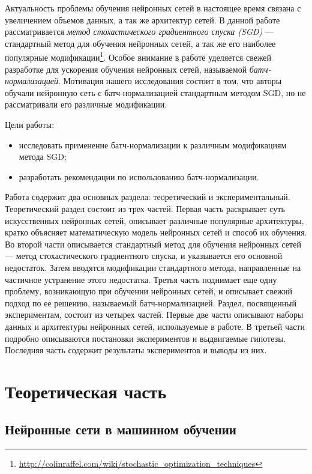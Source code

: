 \documentclass[12pt]{article}
\begin{document}
Актуальность проблемы обучения нейронных сетей в настоящее время связана с увеличением объемов данных, а так же архитектур сетей. В данной работе рассматривается \textit{метод стохастического градиентного спуска (SGD)} \cite{sgd} --- стандартный метод для обучения нейронных сетей, а так же его наиболее популярные модификации\footnote{\url{http://colinraffel.com/wiki/stochastic_optimization_techniques}}. Особое внимание в работе уделяется свежей разработке \cite{BN} для ускорения обучения нейронных сетей, называемой \textit{батч-нормализацией}. Мотивация нашего исследования состоит в том, что авторы обучали нейронную сеть с батч-нормализацией стандартным методом SGD, но не рассматривали его различные модификации. 

Цели работы: 
\begin{itemize}
\item исследовать применение батч-нормализации к различным модификациям метода SGD;
\item разработать рекомендации по использованию батч-нормализации.
\end{itemize}

Работа содержит два основных раздела: теоретический и экспериментальный. Теоретический раздел состоит из трех частей. Первая часть раскрывает суть искусственных нейронных сетей, описывает различные популярные архитектуры, кратко объясняет математическую модель нейронных сетей и способ их обучения. Во второй части описывается стандартный метод для обучения нейронных сетей --- метод стохастического градиентного спуска, и указывается его основной недостаток. Затем вводятся модификации стандартного метода, направленные на частичное устранение этого недостатка. Третья часть поднимает еще одну проблему, возникающую при обучении нейронных сетей, и описывает свежий подход по ее решению, называемый батч-нормализацией. Раздел, посвященный экспериментам, состоит из четырех частей. Первые две части описывают наборы данных и архитектуры нейронных сетей, используемые в работе. В третьей части подробно описываются постановки экспериментов и выдвигаемые гипотезы. Последняя часть содержит результаты экспериментов и выводы из них.


\section{Теоретическая часть}

\subsection{Нейронные сети в машинном обучении}
\end{document}
